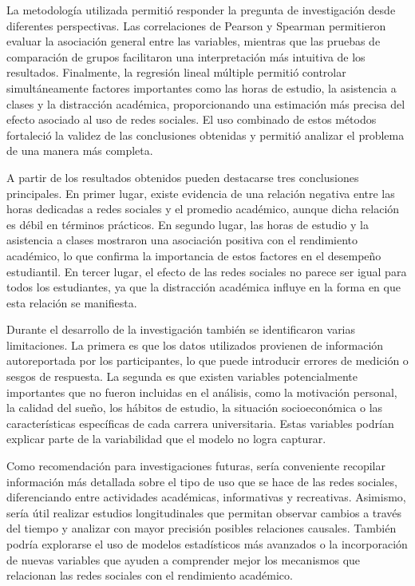 \documentclass[12pt]{article}
\begin{document}
La metodología utilizada permitió responder la pregunta de investigación desde diferentes perspectivas. Las correlaciones de Pearson y Spearman permitieron evaluar la asociación general entre las variables, mientras que las pruebas de comparación de grupos facilitaron una interpretación más intuitiva de los resultados. Finalmente, la regresión lineal múltiple permitió controlar simultáneamente factores importantes como las horas de estudio, la asistencia a clases y la distracción académica, proporcionando una estimación más precisa del efecto asociado al uso de redes sociales. El uso combinado de estos métodos fortaleció la validez de las conclusiones obtenidas y permitió analizar el problema de una manera más completa.

A partir de los resultados obtenidos pueden destacarse tres conclusiones principales. En primer lugar, existe evidencia de una relación negativa entre las horas dedicadas a redes sociales y el promedio académico, aunque dicha relación es débil en términos prácticos. En segundo lugar, las horas de estudio y la asistencia a clases mostraron una asociación positiva con el rendimiento académico, lo que confirma la importancia de estos factores en el desempeño estudiantil. En tercer lugar, el efecto de las redes sociales no parece ser igual para todos los estudiantes, ya que la distracción académica influye en la forma en que esta relación se manifiesta.

Durante el desarrollo de la investigación también se identificaron varias limitaciones. La primera es que los datos utilizados provienen de información autoreportada por los participantes, lo que puede introducir errores de medición o sesgos de respuesta. La segunda es que existen variables potencialmente importantes que no fueron incluidas en el análisis, como la motivación personal, la calidad del sueño, los hábitos de estudio, la situación socioeconómica o las características específicas de cada carrera universitaria. Estas variables podrían explicar parte de la variabilidad que el modelo no logra capturar.

Como recomendación para investigaciones futuras, sería conveniente recopilar información más detallada sobre el tipo de uso que se hace de las redes sociales, diferenciando entre actividades académicas, informativas y recreativas. Asimismo, sería útil realizar estudios longitudinales que permitan observar cambios a través del tiempo y analizar con mayor precisión posibles relaciones causales. También podría explorarse el uso de modelos estadísticos más avanzados o la incorporación de nuevas variables que ayuden a comprender mejor los mecanismos que relacionan las redes sociales con el rendimiento académico.
\end{document}
